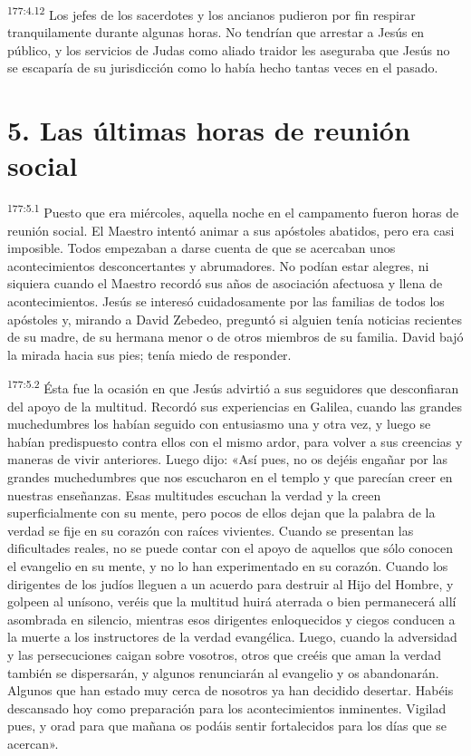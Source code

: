 \par
\textsuperscript{177:4.12} Los jefes de los sacerdotes y los ancianos pudieron por fin respirar tranquilamente durante algunas horas. No tendrían que arrestar a Jesús en público, y los servicios de Judas como aliado traidor les aseguraba que Jesús no se escaparía de su jurisdicción como lo había hecho tantas veces en el pasado.

\section*{5. Las últimas horas de reunión social}
\par
\textsuperscript{177:5.1} Puesto que era miércoles, aquella noche en el campamento fueron horas de reunión social. El Maestro intentó animar a sus apóstoles abatidos, pero era casi imposible. Todos empezaban a darse cuenta de que se acercaban unos acontecimientos desconcertantes y abrumadores. No podían estar alegres, ni siquiera cuando el Maestro recordó sus años de asociación afectuosa y llena de acontecimientos. Jesús se interesó cuidadosamente por las familias de todos los apóstoles y, mirando a David Zebedeo, preguntó si alguien tenía noticias recientes de su madre, de su hermana menor o de otros miembros de su familia. David bajó la mirada hacia sus pies; tenía miedo de responder.

\par
\textsuperscript{177:5.2} Ésta fue la ocasión en que Jesús advirtió a sus seguidores que desconfiaran del apoyo de la multitud. Recordó sus experiencias en Galilea, cuando las grandes muchedumbres los habían seguido con entusiasmo una y otra vez, y luego se habían predispuesto contra ellos con el mismo ardor, para volver a sus creencias y maneras de vivir anteriores. Luego dijo: «Así pues, no os dejéis engañar por las grandes muchedumbres que nos escucharon en el templo y que parecían creer en nuestras enseñanzas. Esas multitudes escuchan la verdad y la creen superficialmente con su mente, pero pocos de ellos dejan que la palabra de la verdad se fije en su corazón con raíces vivientes. Cuando se presentan las dificultades reales, no se puede contar con el apoyo de aquellos que sólo conocen el evangelio en su mente, y no lo han experimentado en su corazón. Cuando los dirigentes de los judíos lleguen a un acuerdo para destruir al Hijo del Hombre, y golpeen al unísono, veréis que la multitud huirá aterrada o bien permanecerá allí asombrada en silencio, mientras esos dirigentes enloquecidos y ciegos conducen a la muerte a los instructores de la verdad evangélica. Luego, cuando la adversidad y las persecuciones caigan sobre vosotros, otros que creéis que aman la verdad también se dispersarán, y algunos renunciarán al evangelio y os abandonarán. Algunos que han estado muy cerca de nosotros ya han decidido desertar. Habéis descansado hoy como preparación para los acontecimientos inminentes. Vigilad pues, y orad para que mañana os podáis sentir fortalecidos para los días que se acercan».

